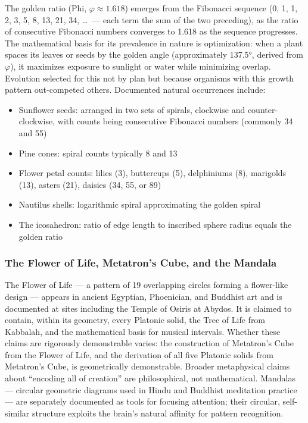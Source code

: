 \documentclass[11pt,letterpaper]{article}
\begin{document}
The golden ratio (Phi, $\varphi \approx 1.618$) emerges from the Fibonacci sequence (0, 1, 1, 2, 3, 5, 8, 13, 21, 34, \ldots\ --- each term the sum of the two preceding), as the ratio of consecutive Fibonacci numbers converges to 1.618 as the sequence progresses. The mathematical basis for its prevalence in nature is optimization: when a plant spaces its leaves or seeds by the golden angle (approximately 137.5°, derived from $\varphi$), it maximizes exposure to sunlight or water while minimizing overlap. Evolution selected for this not by plan but because organisms with this growth pattern out-competed others. Documented natural occurrences include:

\begin{itemize}[noitemsep]
  \item Sunflower seeds: arranged in two sets of spirals, clockwise and counter-clockwise, with counts being consecutive Fibonacci numbers (commonly 34 and 55)
  \item Pine cones: spiral counts typically 8 and 13
  \item Flower petal counts: lilies (3), buttercups (5), delphiniums (8), marigolds (13), asters (21), daisies (34, 55, or 89)
  \item Nautilus shells: logarithmic spiral approximating the golden spiral
  \item The icosahedron: ratio of edge length to inscribed sphere radius equals the golden ratio
\end{itemize}

\subsubsection{The Flower of Life, Metatron's Cube, and the Mandala}

The Flower of Life --- a pattern of 19 overlapping circles forming a flower-like design --- appears in ancient Egyptian, Phoenician, and Buddhist art and is documented at sites including the Temple of Osiris at Abydos. It is claimed to contain, within its geometry, every Platonic solid, the Tree of Life from Kabbalah, and the mathematical basis for musical intervals. Whether these claims are rigorously demonstrable varies: the construction of Metatron's Cube from the Flower of Life, and the derivation of all five Platonic solids from Metatron's Cube, is geometrically demonstrable. Broader metaphysical claims about ``encoding all of creation'' are philosophical, not mathematical. Mandalas --- circular geometric diagrams used in Hindu and Buddhist meditation practice --- are separately documented as tools for focusing attention; their circular, self-similar structure exploits the brain's natural affinity for pattern recognition.
\end{document}
